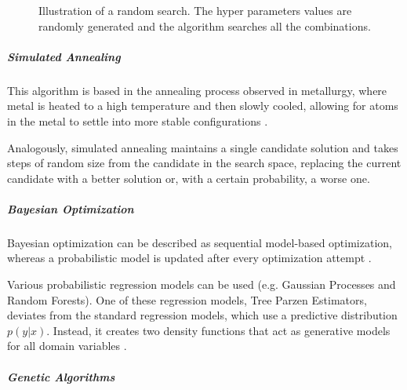 \begin{figure}[h]
	\centering
    \caption{Illustration of a random search. The hyper parameters values are randomly generated and the algorithm searches all the combinations.}
    \label{random}
 \end{figure}

\subparagraph{Simulated Annealing}

This algorithm is based in the annealing process observed in metallurgy, where metal is heated to a high temperature and then slowly cooled, allowing for atoms in the metal to settle into more stable configurations \parencite{elshawi2019automated}.

Analogously, simulated annealing maintains a single candidate solution and takes steps of random size from the candidate in the search space, replacing the current candidate with a better solution or, with a certain probability, a worse one.

\subparagraph{Bayesian Optimization}

Bayesian optimization can be described as sequential model-based optimization, whereas a probabilistic model is updated after every optimization attempt \parencite{dewancker}.

Various probabilistic regression models can be used (e.g. Gaussian Processes and Random Forests). One of these regression models, Tree Parzen Estimators, deviates from the standard regression models, which use a predictive distribution $p(y|x)$. Instead, it creates two density functions that act as generative models for all domain variables \parencite{NIPS2011_86e8f7ab}\parencite{elshawi2019automated}.

\subparagraph{Genetic Algorithms}

